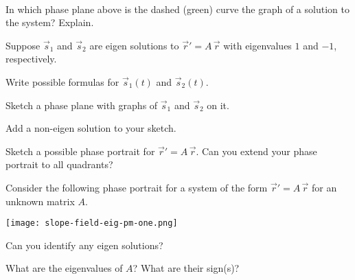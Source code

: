 \documentclass{workbook}
\begin{document}
\begin{slide}
\begin{parts}
\begin{minipage}[t]{.45\textwidth}
\begin{center}
\\
			\end{center}
		\end{minipage}
			In which phase plane above is the dashed (green) curve the graph of a solution to the system? Explain.


	\end{parts}
\end{slide}

\begin{slide}
	\question
		Suppose $\vec s_1$ and $\vec s_2$ are eigen solutions to $\vec r'=A\,\vec r$ with eigenvalues $1$ and $-1$, respectively.
	\begin{parts}
		\item Write possible formulas for $\vec s_1(t)$ and $\vec s_2(t)$.
		\item Sketch a phase plane with graphs of $\vec s_1$ and $\vec s_2$ on it.
		\item Add a non-eigen solution to your sketch.
		\item Sketch a possible phase portrait for $\vec r'=A\,\vec r$. Can you extend your phase portrait to all quadrants?
	\end{parts}
\end{slide}

\begin{slide}
	\question
		Consider the following phase portrait for a system of the form $\vec r'=A\,\vec r$
		for an unknown matrix $A$.

		\begin{center}
		\texttt{[image: slope-field-eig-pm-one.png]}
		\end{center}
	\begin{parts}
		\item Can you identify any eigen solutions?
		\item What are the eigenvalues of $A$? What are their sign(s)?
	\end{parts}
\end{slide}
\end{document}
